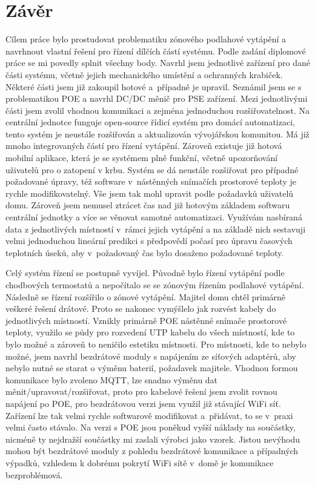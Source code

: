 \chapter{Závěr}
Cílem práce bylo prostudovat problematiku zónového podlahové vytápění a navrhnout vlastní řešení pro řízení dílčích částí systému. Podle zadání diplomové práce se mi povedly splnit všechny body. Navrhl jsem jednotlivé zařízení pro dané části systému, včetně jejich mechanického umístění a ochranných krabiček. Některé části jsem již zakoupil hotové a~případně je upravil. Seznámil jsem se s problematikou POE a navrhl DC/DC měnič pro PSE zařízení. Mezi jednotlivými části jsem zvolil vhodnou komunikaci a zejména jednoduchou rozšiřovatelnost. Na centrální jednotce funguje open-source řídicí systém pro domácí automatizaci, tento systém je neustále rozšiřován a aktualizován vývojářskou komunitou. Má již mnoho integrovaných částí pro řízení vytápění. Zároveň existuje již hotová mobilní aplikace, která je se systémem plně funkční, včetně upozorňování uživatelů pro o zatopení v krbu. Systém se dá neustále rozšiřovat pro případné požadované úpravy, též software v~nástěnných snímačích prostorové teploty je rychle modifikovatelný. Vše jsem tak mohl upravit podle požadavků uživatelů domu. Zároveň jsem nemusel ztrácet čas nad již hotovým základem softwaru centrální jednotky a více se věnovat samotné automatizaci. Využívám nasbíraná data z jednotlivých místností v~rámci jejich vytápění a na základě nich sestavuji velmi jednoduchou lineární predikci s předpovědí počasí pro úpravu časových teplotních úseků, aby v~požadovaný čas bylo dosaženo požadované teploty. 

Celý systém řízení se postupně vyvíjel. Původně bylo řízení vytápění podle chodbových termostatů a nepočítalo se se zónovým řízením podlahové vytápění. Následně se řízení rozšířilo o zónové vytápění. Majitel domu chtěl primárně veškeré řešení drátové. Proto se nakonec vymýšlelo jak rozvést kabely do jednotlivých místností. Vznikly primárně POE nástěnné snímače prostorové teploty, využilo se půdy pro rozvedení UTP kabelu do všech místností, kde to bylo možné a zároveň to neničilo estetiku místnosti. Pro místnosti, kde to nebylo možné, jsem navrhl bezdrátové moduly s napájením ze síťových adaptérů, aby nebylo nutné se starat o výměnu baterií, požadavek majitele. Vhodnou formou komunikace bylo zvoleno MQTT, lze snadno výměnu dat měnit/upravovat/rozšiřovat, proto pro kabelové řešení jsem zvolit rovnou napájení po POE, pro bezdrátovou verzi jsem využil již stávající WiFi síť. Zařízení lze tak velmi rychle softwarově modifikovat a~přidávat, to se v~praxi velmi často stávalo. Na verzi s POE jsou poněkud vyšší náklady na součástky, nicméně ty nejdražší součástky mi zaslali výrobci jako vzorek. Jistou nevýhodu mohou být bezdrátové moduly z pohledu bezdrátové komunikace a případných výpadků, vzhledem k dobrému pokrytí WiFi sítě v~domě je komunikace bezproblémová.

